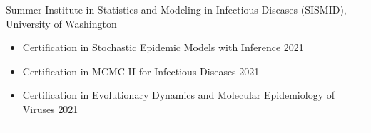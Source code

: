 \documentclass{article}
\begin{document}
	
	\begin{description}
		\vspace{-2mm}
		\item[Certifications]\hspace*{.01in}
		
		Summer Institute in Statistics and Modeling in Infectious Diseases (SISMID), University of Washington
		\vspace*{-1mm}
		
		\begin{itemize}
			\item Certification in Stochastic Epidemic Models with Inference  \hfill{2021}
			\item Certification in MCMC II for Infectious Diseases \hfill{2021}
			\item Certification in Evolutionary Dynamics and Molecular Epidemiology of Viruses \hfill{2021}
		\end{itemize}
	\end{description}
	\vspace{-2mm}
	\rule{\linewidth}{1pt}
	
	
	
\end{document}
